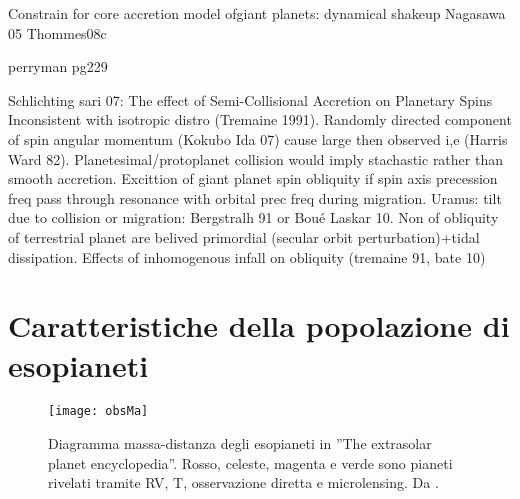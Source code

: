 \begin{workout}

\end{workout}

\begin{workout}
Constrain for core accretion model ofgiant planets: dynamical shakeup Nagasawa 05 Thommes08c
\end{workout}

\begin{workout}
perryman pg229
\end{workout}


\begin{workout}

\end{workout}

\begin{workout}
Schlichting sari 07: The effect of Semi-Collisional Accretion on Planetary Spins
Inconsistent with isotropic distro (Tremaine 1991). Randomly directed component of spin angular momentum (Kokubo Ida 07) cause large then observed i,e (Harris Ward 82).
Planetesimal/protoplanet collision would imply stachastic rather than smooth accretion.
Excittion of giant planet spin obliquity if spin axis precession freq pass through resonance with orbital prec freq during migration.
Uranus: tilt due to collision or migration: Bergstralh 91 or Bou\'e Laskar 10.
Non of obliquity of terrestrial planet are belived primordial (secular orbit perturbation)+tidal dissipation.
Effects of inhomogenous infall on obliquity (tremaine 91, bate 10)
\end{workout}


{\let\clearpage\relax\let\cleardoublepage\relax
\chapter{Caratteristiche della popolazione di esopianeti}
}

\begin{wrapfigure}[10]{l}{0.65\textwidth}
\texttt{[image: obsMa]}
\caption{Diagramma massa-distanza degli esopianeti in ''The extrasolar planet encyclopedia''. Rosso, celeste, magenta e verde sono pianeti rivelati tramite RV, T, osservazione diretta e microlensing. Da \cite{mordasini2018planetary}.}\label{fig:Maplot}
\end{wrapfigure}

